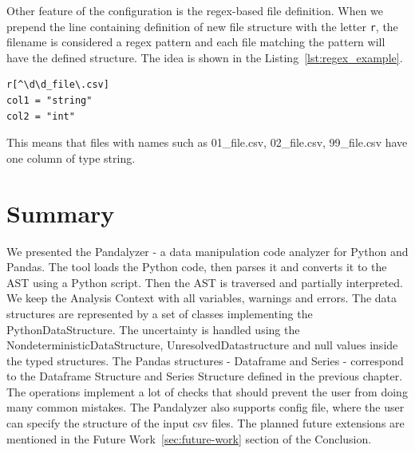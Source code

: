 Other feature of the configuration is the regex-based file definition.
When we prepend the line containing definition of new file structure with the letter \verb|r|, the filename is
considered a regex pattern and each file matching the pattern will have the defined structure.
The idea is shown in the Listing~\ref{lst:regex_example}.

\begin{lstlisting}[caption=An example regex-based file definition, label={lst:regex_example}, captionpos=b]
r[^\d\d_file\.csv]
col1 = "string"
col2 = "int"
\end{lstlisting}

This means that files with names such as 01\_file.csv, 02\_file.csv, 99\_file.csv have one column of type string.

\section*{Summary}

We presented the Pandalyzer - a data manipulation code analyzer for Python and Pandas.
The tool loads the Python code, then parses it and converts it to the AST using a Python script.
Then the AST is traversed and partially interpreted.
We keep the Analysis Context with all variables, warnings and errors.
The data structures are represented by a set of classes implementing the PythonDataStructure.
The uncertainty is handled using the NondeterministicDataStructure, UnresolvedDatastructure and null values inside the
typed structures.
The Pandas structures - Dataframe and Series - correspond to the Dataframe Structure and Series Structure defined
in the previous chapter.
The operations implement a lot of checks that should prevent the user from doing many common mistakes.
The Pandalyzer also supports config file, where the user can specify the structure of the input csv files.
The planned future extensions are mentioned in the Future Work~\ref{sec:future-work} section of the Conclusion.